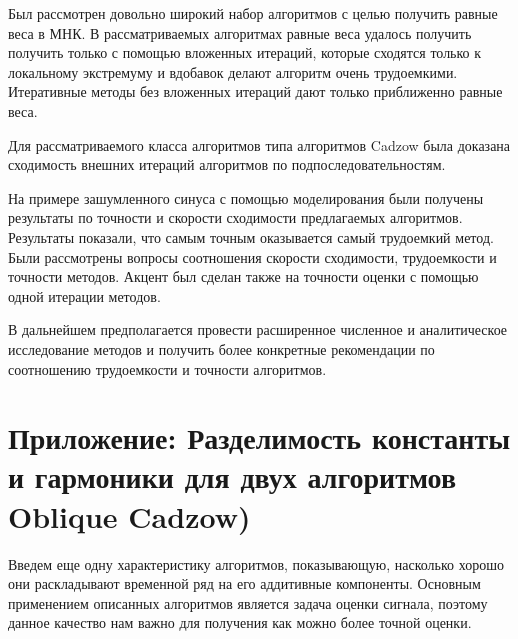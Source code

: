 \documentclass[12pt,a4paper,fleqn,leqno]{article}
\begin{document}
Был рассмотрен довольно широкий набор алгоритмов с целью получить равные веса в МНК. В рассматриваемых алгоритмах равные веса удалось получить
получить только с помощью вложенных итераций, которые сходятся только к локальному экстремуму и вдобавок делают алгоритм очень трудоемкими.
Итеративные методы без вложенных итераций дают только приближенно равные веса.

Для рассматриваемого класса алгоритмов типа алгоритмов Cadzow была доказана сходимость внешних итераций алгоритмов по подпоследовательностям.

На примере зашумленного синуса с помощью моделирования были получены результаты по точности и скорости сходимости предлагаемых алгоритмов.
Результаты показали, что самым точным оказывается самый трудоемкий метод.
Были рассмотрены вопросы соотношения скорости сходимости, трудоемкости и точности методов.
Акцент был сделан также на точности оценки с помощью одной итерации методов.

В дальнейшем предполагается провести расширенное численное и аналитическое исследование методов и получить более конкретные рекомендации по
соотношению трудоемкости и точности алгоритмов.




\section{Приложение: Разделимость константы и гармоники для двух алгоритмов Oblique Cadzow)}
\label{sec:app}

Введем еще одну характеристику алгоритмов, показывающую, насколько хорошо они раскладывают временной ряд на его аддитивные компоненты. Основным применением описанных алгоритмов является задача оценки сигнала, поэтому данное качество нам важно для получения как можно более точной оценки.
\end{document}
